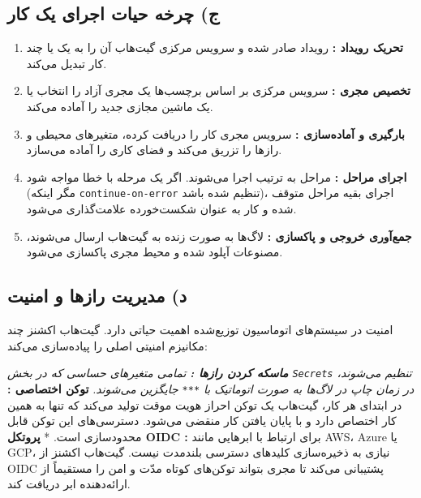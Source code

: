 \documentclass[12pt,a4paper,openany]{book}
\begin{document}
\subsection{ج) چرخه حیات اجرای یک کار }

\begin{enumerate}
\item \textbf{تحریک رویداد :} رویداد صادر شده و سرویس مرکزی گیت‌هاب آن را به یک یا چند کار تبدیل می‌کند.
\item \textbf{تخصیص مجری :} سرویس مرکزی بر اساس برچسب‌ها  یک مجری آزاد را انتخاب یا یک ماشین مجازی جدید را آماده می‌کند.
\item \textbf{بارگیری و آماده‌سازی :} سرویس مجری  کار را دریافت کرده، متغیرهای محیطی و رازها  را تزریق می‌کند و فضای کاری  را آماده می‌سازد.
\item \textbf{اجرای مراحل :} مراحل به ترتیب اجرا می‌شوند. اگر یک مرحله با خطا مواجه شود (مگر اینکه \texttt{continue-on-error} تنظیم شده باشد)، اجرای بقیه مراحل متوقف شده و کار به عنوان شکست‌خورده علامت‌گذاری می‌شود.
\item \textbf{جمع‌آوری خروجی و پاکسازی :} لاگ‌ها به صورت زنده به گیت‌هاب ارسال می‌شوند، مصنوعات  آپلود شده و محیط مجری پاکسازی می‌شود.
\end{enumerate}
\subsection{د) مدیریت رازها و امنیت }

امنیت در سیستم‌های اتوماسیون توزیع‌شده اهمیت حیاتی دارد. گیت‌هاب اکشنز چند مکانیزم امنیتی اصلی را پیاده‌سازی می‌کند:

\textit{ \textbf{ماسکه کردن رازها :} تمامی متغیرهای حساسی که در بخش \texttt{Secrets} تنظیم می‌شوند، در زمان چاپ در لاگ‌ها به صورت اتوماتیک با \texttt{***} جایگزین می‌شوند. } \textbf{توکن اختصاصی :} در ابتدای هر کار، گیت‌هاب یک توکن احراز هویت موقت تولید می‌کند که تنها به همین کار اختصاص دارد و با پایان یافتن کار منقضی می‌شود. دسترسی‌های این توکن قابل محدودسازی  است. * \textbf{پروتکل OIDC :} برای ارتباط با ابرهایی مانند AWS، Azure یا GCP، نیازی به ذخیره‌سازی کلیدهای دسترسی بلندمدت نیست. گیت‌هاب اکشنز از OIDC پشتیبانی می‌کند تا مجری بتواند توکن‌های کوتاه مدّت و امن را مستقیماً از ارائه‌دهنده ابر دریافت کند.
\end{document}

